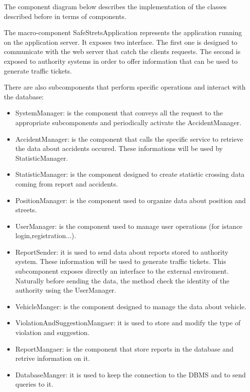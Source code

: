 The component diagram below describes the implementation of the classes described before in terms of components.

The macro-component SafeStretsApplication represents the application running on the application server. It exposes two interface. The first one is designed to communicate with the web server that catch the clients requests. The second is exposed to authority systems in order to offer information that can be used to generate traffic tickets.

There are also subcomponents that perform specific operations and interact with the database:
\begin{itemize}
 \item 
 SystemManager: is the component that conveys all the request to the appropriate subcomponents and periodically activate the AccidentManager.
 \item 
 AccidentManager: is the component that calls the specific service to retrieve the data about accidents occured. These informations will be used by StatisticManager.
 \item
 StatisticManager: is the component designed to create statistic crossing data coming from report and accidents.
 \item 
 PositionManager: is the component used to organize data about position and streets.
 \item 
 UserManager: is the component used to manage user operations (for istance login,registration...).
 \item
 ReportSender: it is used to send data about reports stored to authority system. These information will be used to generate traffic tickets. This subcomponent exposes directly an interface to the external enviroment. Naturally before sending the data, the method check the identity of the authority using the UserManager.
 \item 
 VehicleManger: is the component designed to manage the data about vehicle.
 \item 
 ViolationAndSuggestionMangaer: it is used to store and modify the type of violation and suggestion.
 \item 
 ReportMangaer: is the component that store reports in the database and retrive information on it.
 \item 
 DatabaseManger: it is used to keep the connection to the DBMS and to send queries to it.
 
\end{itemize}

